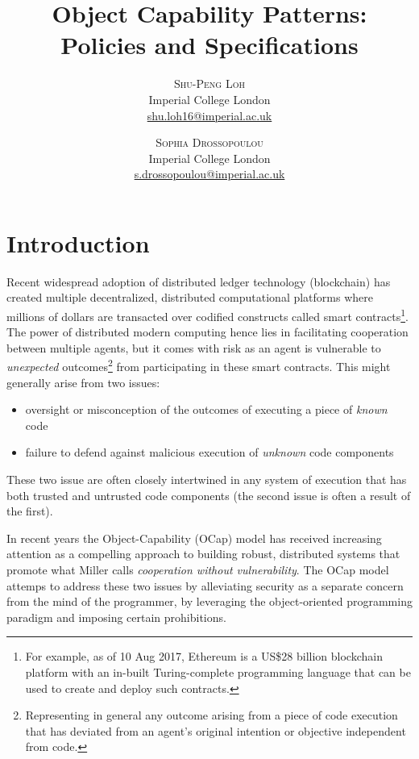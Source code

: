 \documentclass[a4paper,11pt, twoside,twocolumn]{article}
\title{Object Capability Patterns:\\Policies and Specifications} %
\author{%
\textsc{Shu-Peng Loh} \\[1ex] %
\normalsize Imperial College London \\ %
\normalsize \href{mailto:shu.loh16@imperial.ac.uk}{shu.loh16@imperial.ac.uk} %
\and %
\textsc{Sophia Drossopoulou}\\[1ex] %
\normalsize Imperial College London \\ %
\normalsize \href{mailto:s.drossopoulou@imperial.ac.uk}{s.drossopoulou@imperial.ac.uk} %
}
\date{} %
\begin{document}
\renewcommand{\ref}[1]{\textit{\autoref{#1}}}
\maketitle


\section{Introduction}
Recent widespread adoption of distributed ledger technology (blockchain) has created multiple decentralized, distributed computational platforms where millions of dollars are transacted over codified constructs called smart contracts\footnote{For example, as of 10 Aug 2017, Ethereum is a US\$28 billion blockchain platform with an in-built Turing-complete programming language that can be used to create and deploy such contracts.}.
The power of distributed modern computing hence lies in facilitating cooperation between multiple agents, but it comes with risk as an agent is vulnerable to \textit{unexpected} outcomes\footnote{Representing in general any outcome arising from a piece of code execution that has deviated from an agent's original intention or objective independent from code.} from participating in these smart contracts. This might generally arise from two issues: 
\begin{itemize}
\item oversight or misconception of the outcomes of executing a piece of \textit{known} code
\item failure to defend against malicious execution of \textit{unknown} code components\end{itemize}
\noindent These two issue are often closely intertwined in any system of execution that has both trusted and untrusted code components (the second issue is often a result of the first).

In recent years the Object-Capability (OCap) model has received increasing attention as a compelling approach to building robust, distributed systems that promote what Miller\cite{miller2006} calls \textit{cooperation without vulnerability}. The OCap model attemps to address these two issues by alleviating security as a separate concern from the mind of the programmer, by leveraging the object-oriented programming paradigm and imposing certain prohibitions.
\end{document}

